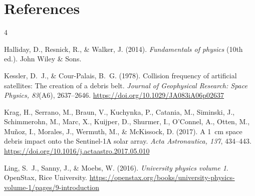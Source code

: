 \newpage
\section*{References}
\renewcommand{\refname}{}
\vspace{-1.2cm}
\begin{thebibliography}{4}

Halliday, D., Resnick, R., \& Walker, J. (2014).
\textit{Fundamentals of physics} (10th ed.). John Wiley \& Sons.

Kessler, D.~J., \& Cour-Palais, B.~G. (1978). Collision frequency of
artificial satellites: The creation of a debris belt.
\textit{Journal of Geophysical Research: Space Physics, 83}(A6),
2637--2646. \url{https://doi.org/10.1029/JA083iA06p02637}

Krag, H., Serrano, M., Braun, V., Kuchynka, P., Catania, M., Siminski, J.,
Schimmerohn, M., Marc, X., Kuijper, D., Shurmer, I., O'Connel, A.,
Otten, M., Mu\~noz, I., Morales, J., Wermuth, M., \& McKissock, D. (2017).
A 1~cm space debris impact onto the Sentinel-1A solar array.
\textit{Acta Astronautica, 137}, 434--443.
\url{https://doi.org/10.1016/j.actaastro.2017.05.010}

Ling, S.~J., Sanny, J., \& Moebs, W. (2016). \textit{University physics
volume 1}. OpenStax, Rice University.
\url{https://openstax.org/books/university-physics-volume-1/pages/9-introduction}

\end{thebibliography}
